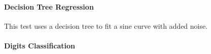 \documentclass[11pt]{article}
\begin{document}
 
 





\paragraph{Decision Tree Regression}

This test uses a decision tree to fit a sine curve with added noise.




\paragraph{Digits Classification}
\end{document}
